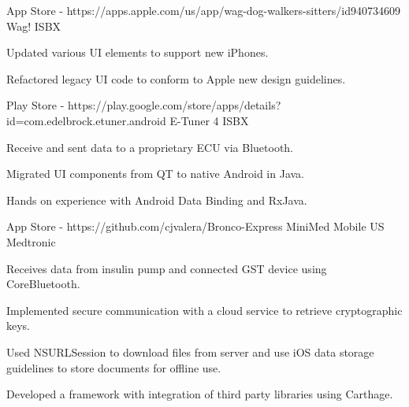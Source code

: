 

\begin{cventries}

  \cventry
    {App Store - https://apps.apple.com/us/app/wag-dog-walkers-sitters/id940734609} %
    {Wag!} %
    {ISBX} %
    {} %
    {
      \begin{cvitems} %
        \item {Updated various UI elements to support new iPhones.}
        \item {Refactored legacy UI code to conform to Apple new design guidelines.}
      \end{cvitems}
    }

  \cventry
    {Play Store - https://play.google.com/store/apps/details?id=com.edelbrock.etuner.android} %
    {E-Tuner 4} %
    {ISBX} %
    {} %
    {
      \begin{cvitems} %
        \item {Receive and sent data to a proprietary ECU via Bluetooth.}
        \item {Migrated UI components from QT to native Android in Java.}
        \item {Hands on experience with Android Data Binding and RxJava.}
      \end{cvitems}
    }
    
  \cventry
    {App Store - https://github.com/cjvalera/Bronco-Express} %
    {MiniMed Mobile US} %
    {Medtronic} %
    {} %
    {
      \begin{cvitems} %
        \item {Receives data from insulin pump and connected GST device using CoreBluetooth.}
        \item {Implemented secure communication with a cloud service to retrieve cryptographic keys.}
        \item {Used NSURLSession to download files from server and use iOS data storage guidelines to store documents for offline use.}
        \item {Developed a framework with integration of third party libraries using Carthage.}
      \end{cvitems}
    }
    

\end{cventries}
